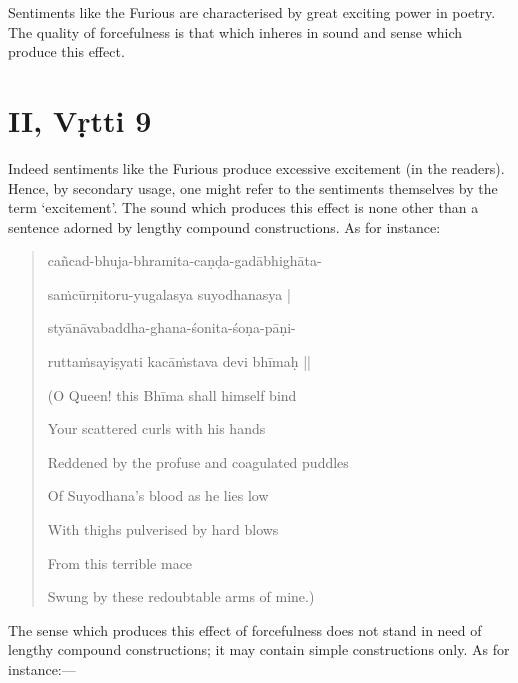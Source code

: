 \documentclass[12pt]{book}
\begin{document}
Sentiments like the Furious are characterised by great
exciting power in poetry. The quality of forcefulness is that
which inheres in sound and sense which produce this effect.


\section{II, Vṛtti 9}

Indeed sentiments like the Furious produce excessive excitement (in the readers). Hence, by secondary usage, one might
refer to the sentiments themselves by the term `excitement'.
The sound which produces this effect is none other than a
sentence adorned by lengthy compound constructions. As for
instance:

\begin{quotation}
\begin{em}
cañcad-bhuja-bhramita-caṇḍa-gadābhighāta-

saṁcūrṇitoru-yugalasya suyodhanasya |

styānāvabaddha-ghana-śonita-śoṇa-pāṇi-

ruttaṁsayiṣyati kacāṁstava devi bhīmaḥ ||

(O Queen! this Bhīma shall himself bind

Your scattered curls with his hands

Reddened by the profuse and coagulated puddles

Of Suyodhana's blood as he lies low

With thighs pulverised by hard blows

From this terrible mace

Swung by these redoubtable arms of mine.)
\end{em}
\end{quotation}

The sense which produces this effect of forcefulness does not
stand in need of lengthy compound constructions; it may contain
simple constructions only. As for instance:---
\end{document}
